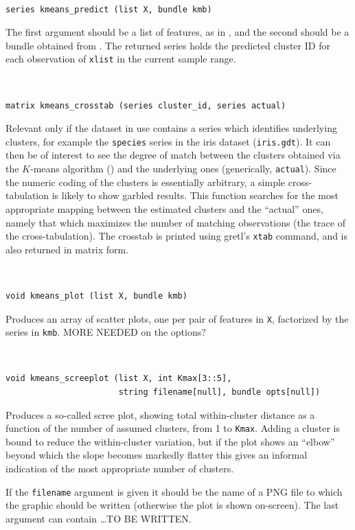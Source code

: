 \documentclass{article}
\newenvironment{funcdoc}
{\noindent\hrulefill\\[-12pt]}
{\medbreak}
\begin{document}
\begin{funcdoc}
\begin{verbatim}
series kmeans_predict (list X, bundle kmb)
\end{verbatim}
  The first argument should be a list of features, as in
  , and the second should be a bundle obtained from
  .  The returned series holds the predicted cluster ID
  for each observation of \texttt{xlist} in the current sample range.
\end{funcdoc}

\begin{funcdoc}
\begin{verbatim}
matrix kmeans_crosstab (series cluster_id, series actual)
\end{verbatim}
  Relevant only if the dataset in use contains a series which identifies
  underlying clusters, for example the \texttt{species} series in the
  iris dataset (\texttt{iris.gdt}). It can then be of interest to see
  the degree of match between the clusters obtained via the $K$-means
  algorithm () and the underlying ones (generically,
  \texttt{actual}). Since the numeric coding of the clusters is
  essentially arbitrary, a simple cross-tabulation is likely to show
  garbled results. This function searches for the most appropriate
  mapping between the estimated clusters and the ``actual'' ones, namely
  that which maximizes the number of matching observations (the trace of
  the cross-tabulation). The crosstab is printed using gretl's
  \texttt{xtab} command, and is also returned in matrix form.
\end{funcdoc}

\begin{funcdoc}
\begin{verbatim}
void kmeans_plot (list X, bundle kmb)
\end{verbatim}
  Produces an array of scatter plots, one per pair of features in
  \texttt{X}, factorized by the  series in
  \texttt{kmb}. MORE NEEDED on the options?
\end{funcdoc}

\begin{funcdoc}
\begin{verbatim}
void kmeans_screeplot (list X, int Kmax[3::5],
                       string filename[null], bundle opts[null])
\end{verbatim}
  Produces a so-called scree plot, showing total within-cluster distance
  as a function of the number of assumed clusters, from 1 to
  \texttt{Kmax}. Adding a cluster is bound to reduce the within-cluster
  variation, but if the plot shows an ``elbow'' beyond which the slope
  becomes markedly flatter this gives an informal indication of the most
  appropriate number of clusters.

  If the \texttt{filename} argument is given it should be the name of a
  PNG file to which the graphic should be written (otherwise the plot is
  shown on-screen). The last argument can contain \dots TO BE WRITTEN.
\end{funcdoc}
\end{document}
